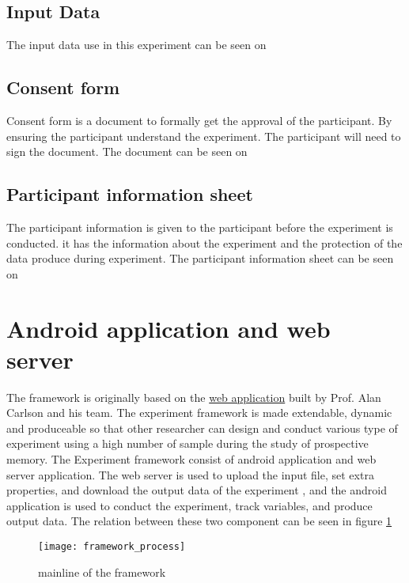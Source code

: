 \subsection{Input Data}
The input data use in this experiment can be seen on 


\subsection{Consent form}
Consent form is a document to formally get the approval of the participant. By ensuring the participant understand the experiment. The participant will need to sign the document. The document can be seen on 

\subsection{Participant information sheet}
The participant information is given to the participant before the experiment is conducted. it has the information about the experiment and the protection of the data produce during experiment. The participant information sheet can be seen on 


\section{Android application and web server}

The framework is originally based on the \href{https://pennstate.qualtrics.com/jfe/form/SV_dpaKW6wlA1Fr7BX}
{web application} built by Prof. Alan Carlson and his team. The experiment framework is made extendable, dynamic and produceable so that other researcher can design and conduct various type of experiment using a high number of sample during the study of prospective memory.
 The Experiment framework consist of android application and web server application. The web server is used to upload the input file, set extra properties, and download the output data of the experiment , and the android application is used to conduct the experiment, track variables, and produce output data. The relation between these two component can be seen in figure \ref{fig:mainline}

\begin{figure}[h]
\texttt{[image: framework\_process]}
\caption{mainline of the framework}
\label{fig:mainline}
\end{figure}

